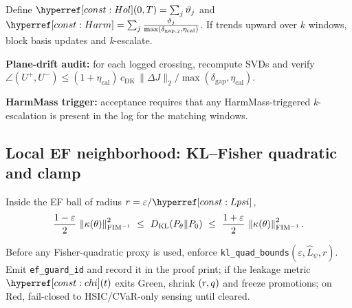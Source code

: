 \begin{proposition}\label{prop:hol-harm}
Define $\constref{Hol}(0,T)=\sum_j \vartheta_j$ and $\constref{Harm}=\sum_j \frac{\vartheta_j}{\max(\delta_{\mathrm{gap},j},\eta_{\mathrm{cal}})}$. If  trends upward over $k$ windows, block basis updates and \emph{k}-escalate.
\end{proposition}

\begin{acceptchecks}
\item \textbf{Plane-drift audit:} for each logged crossing, recompute SVDs and verify $\angle(U^+,U^-)\le (1+\eta_{\mathrm{cal}})\,c_{\mathrm{DK}}\,\|\Delta J\|_2/\max(\delta_{\mathrm{gap}},\eta_{\mathrm{cal}})$.
\item \textbf{HarmMass trigger:} acceptance requires that any HarmMass-triggered \emph{k}-escalation is present in the log for the matching windows.
\end{acceptchecks}

\subsection{Local EF neighborhood: KL–Fisher quadratic and clamp}\label{subsec:ef-guard}
\emph{}

\begin{theorem}\label{thm:FIMbound}
Inside the EF ball of radius $r=\varepsilon/\constref{Lpsi}$,
\[
\frac{1-\varepsilon}{2}\,\normFIM{\kappa(\theta)}^2\ \le\ D_{\mathrm{KL}}(P_\theta\|P_0)\ \le\ \frac{1+\varepsilon}{2}\,\normFIM{\kappa(\theta)}^2.
\]
\end{theorem}

\begin{definition}\label{def:kl-guard}
Before any Fisher-quadratic proxy is used, enforce \texttt{kl\_quad\_bounds$(\varepsilon,\hat L_\psi,r)$}. Emit \texttt{ef\_guard\_id} and record it in the proof print; if the leakage metric $\constref{chi}(t)$ exits Green, shrink $(r,q)$ and freeze promotions; on Red, fail-closed to HSIC/CVaR-only sensing until cleared.
\end{definition}

